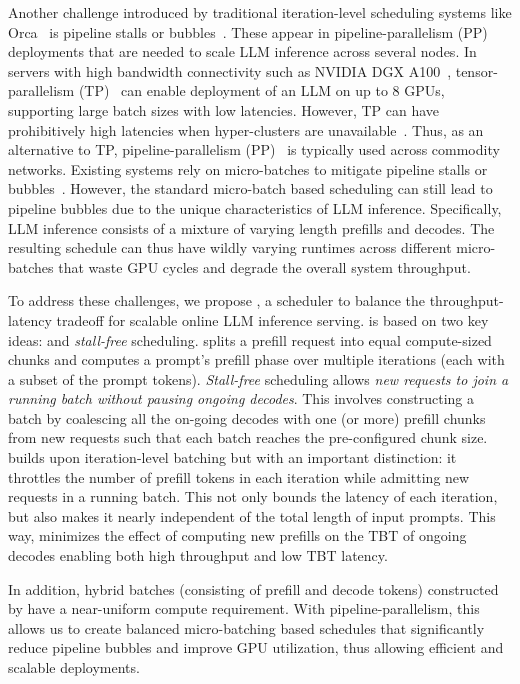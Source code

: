 Another challenge introduced by traditional iteration-level scheduling systems like Orca~\cite{orca} is pipeline stalls or bubbles~\cite{gpipe}. These appear in pipeline-parallelism (PP) deployments that are needed to scale LLM inference across several nodes. In servers with high bandwidth connectivity such as NVIDIA DGX A100~\cite{nvidiadgx}, tensor-parallelism (TP)~\cite{megatron} can enable deployment of an LLM on up to 8 GPUs,  supporting large batch sizes with low latencies. However, TP can have prohibitively high latencies when hyper-clusters are unavailable~\cite{varuna}. Thus, as an alternative to TP, pipeline-parallelism (PP)~\cite{pipedream, varuna} is typically used across commodity networks. Existing systems rely on micro-batches to mitigate pipeline stalls or bubbles~\cite{gpipe}. However, the standard micro-batch based scheduling can still lead to pipeline bubbles due to the unique characteristics of LLM inference. Specifically, LLM inference consists of a mixture of varying length prefills and decodes. The resulting schedule can thus have wildly varying runtimes across different micro-batches that waste GPU cycles and degrade the overall system throughput. 







To address these challenges, we propose \sysname, a scheduler to balance the throughput-latency tradeoff for scalable online LLM inference serving. \sysname is based on two key ideas: \chunking and \textit{stall-free} scheduling. \Chunking splits a prefill request into equal
compute-sized chunks and computes a prompt's prefill phase over multiple iterations (each with a subset of the prompt tokens). \textit{Stall-free} scheduling allows \textit{new requests to join a running batch without pausing ongoing decodes}. This  involves constructing a batch by coalescing all the on-going decodes with one (or more) prefill chunks from new requests such that each batch reaches the pre-configured chunk size. \sysname builds upon iteration-level batching but with an important distinction: it throttles the number of prefill tokens in each iteration while admitting new requests in a running batch. This not only bounds the latency of each iteration, but also makes it nearly independent of the total length of input prompts. This way, \sysname minimizes the effect of computing new prefills on the TBT of ongoing decodes enabling both high throughput and low TBT latency. %


In addition, hybrid batches (consisting of prefill and decode tokens) constructed by \sysname have a near-uniform compute requirement. With pipeline-parallelism, this allows us to create balanced micro-batching based schedules that significantly reduce pipeline bubbles and improve GPU utilization, thus allowing efficient and scalable deployments.










